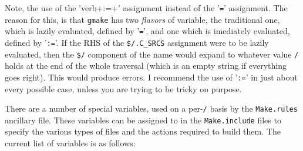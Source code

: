 \documentclass[letterpaper]{article}
\begin{document}
Note, the use of the 'verb+:=+' assignment instead of the '\verb+=+'
assignment.  The reason for this, is that \verb+gmake+ has two {\em flavors}
of variable, the traditional one, which is lazily evaluated, defined by
'\verb+=+', and one which is imediately evaluated, defined by '\verb+:=+'.
If the RHS of the \verb+$/.C_SRCS+ assignment were to be lazily
evaluated, then the \verb+$/+ component of the name would expand to
whatever value \verb+/+ holds at the end of the whole traversal
(which is an empty string if everything goes right).  This would
produce errors.  I recommend the use of '\verb+:=+' in just about
every possible case, unless you are trying to be tricky on purpose.

There are a number of special variables, used on a per-\verb+/+
basis by the \verb+Make.rules+ ancillary file.  These variables can
be assigned to in the \verb+Make.include+ files to specify the various
types of files and the actions required to build them.  The current
list of variables is as follows:\\
\end{document}
